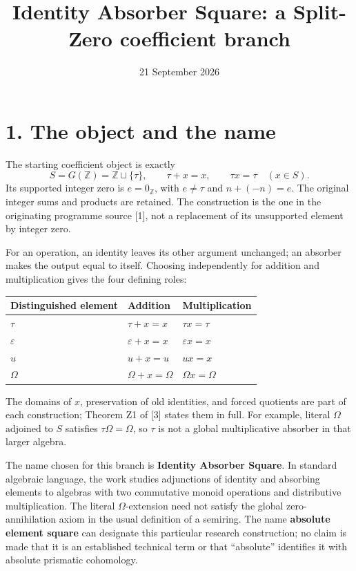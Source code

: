 \documentclass[
]{article}
\title{Identity Absorber Square: a Split-Zero coefficient branch}
\author{}
\date{21 September 2026}
\newcounter{none} %
\begin{document}
\maketitle

{
\setcounter{tocdepth}{3}
\tableofcontents
}
\section{1. The object and the name}\label{the-object-and-the-name}

The starting coefficient object is exactly \[
S=G(\mathbb Z)=\mathbb Z\sqcup\{\tau\},\qquad
\tau+x=x,\qquad \tau x=\tau\quad(x\in S).
\] Its supported integer zero is \(e=0_{\mathbb Z}\), with \(e\ne\tau\)
and \(n+(-n)=e\). The original integer sums and products are retained.
The construction is the one in the originating programme source {[}1{]},
not a replacement of its unsupported element by integer zero.

For an operation, an identity leaves its other argument unchanged; an
absorber makes the output equal to itself. Choosing independently for
addition and multiplication gives the four defining roles:

{\def\LTcaptype{none} %
\begin{longtable}[]{@{}lll@{}}
\toprule\noalign{}
Distinguished element & Addition & Multiplication \\
\midrule\noalign{}
\endhead
\bottomrule\noalign{}
\endlastfoot
\(\tau\) & \(\tau+x=x\) & \(\tau x=\tau\) \\
\(\varepsilon\) & \(\varepsilon+x=x\) & \(\varepsilon x=x\) \\
\(u\) & \(u+x=u\) & \(ux=x\) \\
\(\Omega\) & \(\Omega+x=\Omega\) & \(\Omega x=\Omega\) \\
\end{longtable}
}

The domains of \(x\), preservation of old identities, and forced
quotients are part of each construction; Theorem Z1 of {[}3{]} states
them in full. For example, literal \(\Omega\) adjoined to \(S\)
satisfies \(\tau\Omega=\Omega\), so \(\tau\) is not a global
multiplicative absorber in that larger algebra.

The name chosen for this branch is \textbf{Identity Absorber Square}. In
standard algebraic language, the work studies adjunctions of identity
and absorbing elements to algebras with two commutative monoid
operations and distributive multiplication. The literal
\(\Omega\)-extension need not satisfy the global zero-annihilation axiom
in the usual definition of a semiring. The name \textbf{absolute element
square} can designate this particular research construction; no claim is
made that it is an established technical term or that ``absolute''
identifies it with absolute prismatic cohomology.
\end{document}
